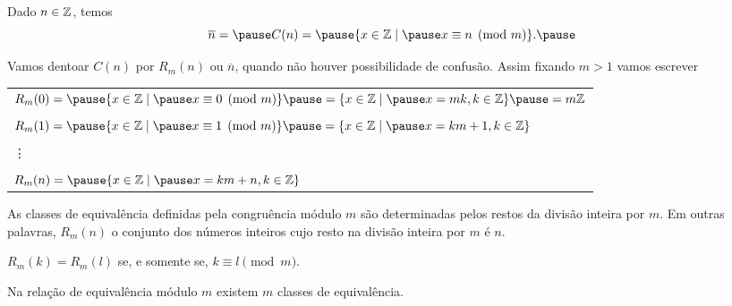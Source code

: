 \documentclass{beamer}
\begin{document}
    \begin{frame}
        Dado $n \in \mathbb{Z}$, temos\pause
        \[
            \overline{n} = \pause C(n) = \pause \{x \in \z \mid \pause x\equiv n \pmod{m}\}.\pause
        \]

        Vamos dentoar $C(n)$ \pause por $R_{m}(n)$ \pause ou $\overline{n}$, \pause quando n{\~a}o houver possibilidade de confus{\~a}o. \pause Assim fixando $m > 1$ vamos escrever\pause
        \begin{center}
            \begin{tabular}{l}
                $R_{m}(0) = \pause \{x \in \z \mid \pause x\equiv 0 \pmod{m}\} \pause =\{x \in \z \mid \pause x = mk, k \in \z\}\pause = m\z$\pause\\
                \\
                $R_{m}(1) = \pause \{x \in \z \mid \pause x\equiv 1 \pmod{m}\} \pause = \{x \in \z \mid \pause x = km + 1, k \in \z \}$\pause \\
                \\
                \vdots\\
                \\
                $R_{m}(n) = \pause \{x \in \z \mid \pause x = km + n, k \in \z \}$
            \end{tabular}
        \end{center}
    \end{frame}

    \begin{frame}
        \begin{proposicao}
            As classes de equival{\^e}ncia definidas pela congru{\^e}ncia m{\'o}dulo $m$ \pause s{\~a}o determinadas pelos restos da divis{\~a}o inteira por $m$. \pause Em outras palavras, $R_{m}(n)$  o conjunto dos n{\'u}meros inteiros \pause cujo resto na divis{\~a}o inteira por $m$ {\'e} $n$.\pause
        \end{proposicao}

        \begin{corolario}
            $R_{m}(k) = R_{m}(l)$ \pause se, e somente se, $k\equiv l \pmod{m}$.
        \end{corolario}
    \end{frame}

    \begin{frame}
        \begin{proposicao}
            Na rela{\c c}{\~a}o de equival{\^e}ncia m{\'o}dulo $m$ existem $m$ classes de equival{\^e}ncia.\pause
        \end{proposicao}
    \end{frame}
\end{document}
